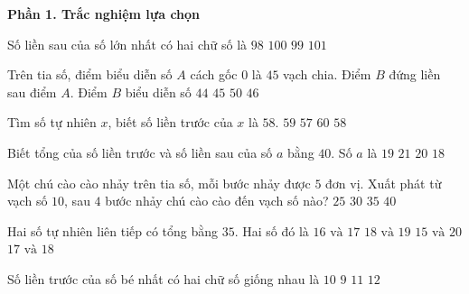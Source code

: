 \textbf{Phần 1. Trắc nghiệm lựa chọn}

\begin{ex} %
Số liền sau của số lớn nhất có hai chữ số là
\choice
{$98$}
{\True $100$}
{$99$}
{$101$}
\end{ex}

\begin{ex} %
Trên tia số, điểm biểu diễn số $A$ cách gốc $0$ là $45$ vạch chia. Điểm $B$ đứng liền sau điểm $A$. Điểm $B$ biểu diễn số
\choice
{$44$}
{$45$}
{$50$}
{\True $46$}
\end{ex}

\begin{ex} %
Tìm số tự nhiên $x$, biết số liền trước của $x$ là $58$.
\choice
{\True $59$}
{$57$}
{$60$}
{$58$}
\end{ex}

\begin{ex} %
Biết tổng của số liền trước và số liền sau của số $a$ bằng $40$. Số $a$ là
\choice
{$19$}
{$21$}
{\True $20$}
{$18$}
\end{ex}

\begin{ex} %
Một chú cào cào nhảy trên tia số, mỗi bước nhảy được $5$ đơn vị. Xuất phát từ vạch số $10$, sau $4$ bước nhảy chú cào cào đến vạch số nào?
\choice
{$25$}
{\True $30$}
{$35$}
{$40$}
\end{ex}

\begin{ex} %
Hai số tự nhiên liên tiếp có tổng bằng $35$. Hai số đó là
\choice
{$16\text{ và } 17$}
{$18\text{ và } 19$}
{$15\text{ và } 20$}
{\True $17\text{ và } 18$}
\end{ex}

\begin{ex} %
Số liền trước của số bé nhất có hai chữ số giống nhau là
\choice
{\True $10$}
{$9$}
{$11$}
{$12$}
\end{ex}

